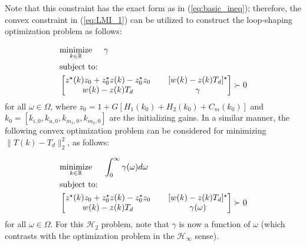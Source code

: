 \documentclass[a4paper, 10pt, conference]{ieeeconf}
\begin{document}
Note that this constraint has the exact form as in (\ref{eq:basic_ineq}); therefore, the convex constraint in (\ref{eq:LMI_1}) can be utilized to construct the loop-shaping optimization problem as follows:

\begin{equation} \label{eq:loop_shape_LMI_inf}
\begin{aligned}
& \underset{ k \in \mathbb{R}}{\text{minimize}} \hspace{0.5cm} \gamma  \\
& \text{subject to:} \\
&
\begin{bmatrix}
z^{\star}(k)z_0 + z_0^{\star}z(k) - z_0^{\star}z_0 & \phantom{xx}[w(k)-z(k)T_d]^{\star} \\ 
w(k)-z(k)T_d & \phantom{xx}\gamma
\end{bmatrix} \succ 0
\end{aligned}
\end{equation}
for all $\omega \in \Omega$, where $z_0 = 1+G[H_1(k_0) + H_2(k_0)+C_m(k_0)]$ and $k_0 =[k_{i,0},k_{u,0},k_{m_1,0},k_{m_2,0}  ]$ are the initializing gains. In a similar manner, the following convex optimization problem can be considered for minimizing  $ \|T(k)- T_d \|_2^2$, as follows:

\begin{equation} \label{eq:loop_shape_LMI_2}
\begin{aligned}
& \underset{ k \in \mathbb{R}}{\text{minimize}} \hspace{0.5cm} \int_0^\infty \gamma(\omega) d\omega  \\
& \text{subject to:} \\
&
\begin{bmatrix}
z^{\star}(k)z_0 + z_0^{\star}z(k) - z_0^{\star}z_0 & \phantom{xx}[w(k)-z(k)T_d]^{\star} \\ 
w(k)-z(k)T_d & \phantom{xx}\gamma(\omega)
\end{bmatrix} \succ 0
\end{aligned}
\end{equation}
for all $\omega \in \Omega$. For this $\mathcal{H}_2$ problem, note that $\gamma$ is now a function of $\omega$ (which contrasts with the optimization problem in the $\mathcal{H}_\infty$ sense). 
\end{document}
